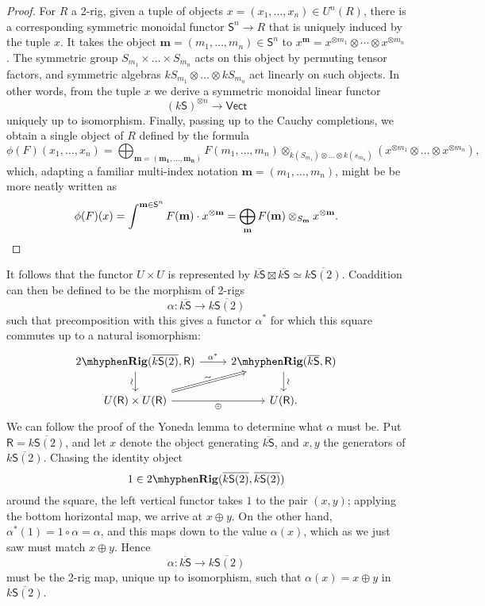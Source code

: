 \documentclass[12pt,reqno]{amsart}
\theoremstyle{plain}
\theoremstyle{definition}
\theoremstyle{remark}
\newcommand{\maps}{\colon}
\newcommand{\category}[1]{\mathsf{#1}}
\newcommand{\R}{\category R}
\renewcommand{\S}{\category S}
\newcommand{\namedcat}[1]{\mathsf{#1}}
\newcommand{\TRig}{2\mhyphen\namedbicat{Rig}}
\newcommand{\Vect}{\namedcat{Vect}}
\newcommand{\namedbicat}[1]{\mathbf{#1}}
\newcommand{\ksbar}{\overline{k\S}}
\numberwithin{thm}{section}
\begin{document}
\begin{proof}
    For $R$ a 2-rig, given a tuple of objects $x = (x_1, \ldots, x_n) \in U^n(R)$, there is a corresponding symmetric monoidal functor $\S^n \to R$ that is uniquely induced by the tuple $x$. It takes the object $\mathbf{m} = (m_1, \ldots, m_n) \in \S^n$ to $x^{\mathbf{m}} = x^{\otimes m_1} \otimes \cdots \otimes x^{\otimes m_n}$. The symmetric group $S_{m_1} \times \ldots \times S_{m_n}$ acts on this object by permuting tensor factors, and symmetric algebras $kS_{m_1} \otimes \ldots \otimes kS_{m_n}$ act linearly on such objects. In other words, from the tuple $x$ we derive a symmetric monoidal linear functor 
    \[ (k\S)^{\otimes n} \to \Vect \]
    uniquely up to isomorphism. Finally, passing up to the Cauchy completions, we obtain a single object of $R$ defined by the formula 
    \[ \phi(F)(x_1, \ldots, x_n) = \bigoplus_\mathbf{m = (m_1, \ldots, m_n)} F(m_1, \ldots, m_n) \otimes_{k(S_{m_1}) \otimes \dots \otimes k(s_{m_n})} (x^{\otimes m_1} \otimes \ldots \otimes x^{\otimes m_n}), \] 
    which, adapting a familiar multi-index notation $\mathbf{m} = (m_1, \ldots, m_n)$, might be be more neatly written as 
    \[ \phi(F)(x) = \int^{\mathbf{m} \in \S^n} F(\mathbf{m}) \cdot x^{\otimes \mathbf{m}} = \bigoplus_\mathbf{m} F(\mathbf{m}) \otimes_{S_{\mathbf{m}}} x^{\otimes \mathbf{m}}. \qedhere \]
\end{proof}

It follows that the functor $U \times U$ is represented by $\ksbar \boxtimes \ksbar \simeq \overline{k\S(2)}$. Coaddition can then be defined to be the morphism of 2-rigs 
\[  
    \alpha \maps \ksbar \to \overline{k\S(2)} 
\]
such that precomposition with this gives a functor $\alpha^*$ for which this square commutes up to a natural isomorphism:
\[  
\begin{tikzcd}
    \TRig(\overline{k\S(2)}, \R) 
    \arrow[d, "\sim", sloped, swap]  
    \arrow[r, "\alpha^*"] 
    &
    \TRig(\ksbar, \R) 
    \arrow[d, "\sim", sloped] 
    \\
    U(\R) \times U(\R) 
    \arrow[ur, Rightarrow, "\sim", sloped]
    \arrow[r, swap, "\oplus"] 
    &
    U(\R).
\end{tikzcd}
\]
We can follow the proof of the Yoneda lemma to determine what $\alpha$ must be. Put $\R = \overline{k\S(2)}$, and let $x$ denote the object generating $\ksbar$, and $x, y$ the generators of $\overline{k\S(2)}$. Chasing the identity object 
\[
    1 \in \TRig(\overline{k\S(2)}, \overline{k\S(2)})
\]
around the square, the left vertical functor takes $1$ to the pair $(x, y)$; applying the bottom horizontal map, we arrive at $x \oplus y$. On the other hand, $\alpha^\ast(1) = 1 \circ \alpha = \alpha$, and this maps down to the value $\alpha(x)$, which as we just saw must match $x \oplus y$. Hence 
\[
    \alpha \maps \ksbar \to \overline{k\S(2)}
\]
must be the 2-rig map, unique up to isomorphism, such that $\alpha(x) = x \oplus y$ in $\overline{k\S(2)}$.
\end{document}
